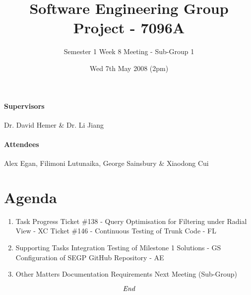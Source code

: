 \documentclass[oneside, 12pt, a4]{article}
\begin{document}
\title{Software Engineering Group Project - 7096A}
\author{Semester 1 Week 8 Meeting - Sub-Group 1}
\date{Wed 7th May 2008 (2pm)}

\maketitle

\paragraph{Supervisors} Dr. David Hemer \& Dr. Li Jiang

\paragraph{Attendees} Alex Egan, Filimoni Lutunaika, George Sainsbury \& Xiaodong Cui

\section*{Agenda}

\begin{enumerate}
\item{Task Progress}
\subitem Ticket \#138 - Query Optimisation for Filtering under Radial View - XC
\subitem Ticket \#146 - Continuous Testing of Trunk Code - FL

\item Supporting Tasks
\subitem Integration Testing of Milestone 1 Solutions - GS
\subitem Configuration of SEGP GitHub Repository - AE

\item Other Matters
\subitem Documentation Requirements
\subitem Next Meeting (Sub-Group)

\end{enumerate}

\[\emph{End}\]
\end{document}
